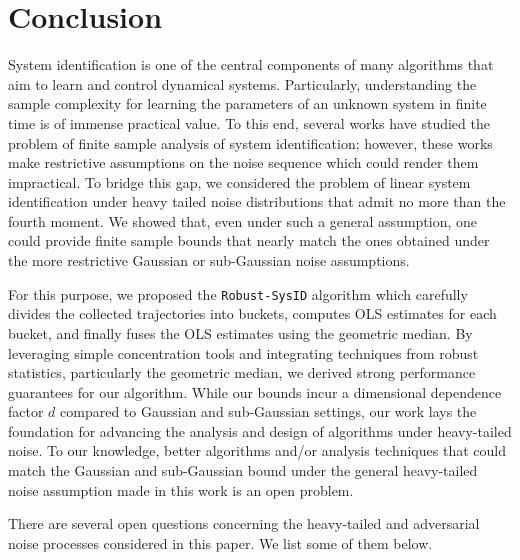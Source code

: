 \documentclass[letterpaper, 11 pt]{article}
\begin{document}
\section{Conclusion}
\label{sec:conclusion}
System identification is one of the central components of many algorithms that aim to learn and control dynamical systems. Particularly, understanding the sample complexity for learning the parameters of an unknown system in finite time is of immense practical value. To this end, several works have studied the problem of finite sample analysis of system identification; however, these works make restrictive assumptions on the noise sequence which could render them impractical. To bridge this gap, we considered the problem of linear system identification under heavy tailed noise distributions that admit no more than the fourth moment. We showed that, even under such a general assumption, one could provide finite sample bounds that nearly match the ones obtained under the more restrictive Gaussian or sub-Gaussian noise assumptions.

For this purpose, we proposed the \texttt{Robust-SysID} algorithm which carefully divides the collected trajectories into buckets, computes OLS estimates for each bucket, and finally fuses the OLS estimates using the geometric median. By leveraging simple concentration tools and integrating techniques from robust statistics, particularly the geometric median, we derived strong performance guarantees for our algorithm. While our bounds incur a dimensional dependence factor $d$ compared to Gaussian and sub-Gaussian settings, our work lays the foundation for advancing the analysis and design of algorithms under heavy-tailed noise. To our knowledge, better algorithms and/or analysis techniques that could match the Gaussian and sub-Gaussian bound under the general heavy-tailed noise assumption made in this work is an open problem. 

There are several open questions concerning the heavy-tailed and adversarial noise processes considered in this paper. We list some of them below.
\end{document}
